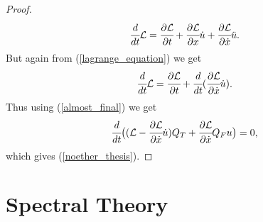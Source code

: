 \documentclass[main.tex]{subfiles}
\begin{document}
\begin{proof}
\begin{equation}
    \cfrac{d}{dt}\mathcal{L} =
    \cfrac{\partial \mathcal{L}}{\partial t} + 
    \cfrac{\partial \mathcal{L}}{\partial x} \dot{u} + \cfrac{\partial \mathcal{L}}{\partial \dot{x}}\ddot{u}.
\end{equation}
But again from (\ref{lagrange_equation}) we get
\begin{equation}
    \cfrac{d}{dt}\mathcal{L} =
    \cfrac{\partial \mathcal{L}}{\partial t} + \cfrac{d}{dt} (\cfrac{\partial \mathcal{L}}{\partial \dot{x}} \dot{u}).
\end{equation}
Thus using (\ref{almost_final}) we get
\begin{equation}
\cfrac{d}{dt}\big((\mathcal{L} - \cfrac{\partial \mathcal{L}}{\partial \dot{x}} \dot{u})Q_T + \cfrac{\partial \mathcal{L}}{\partial \dot{x}} Q_Fu\big) = 0,
\end{equation}
which gives (\ref{noether_thesis}).
\end{proof}
\section{Spectral Theory}
\end{document}
